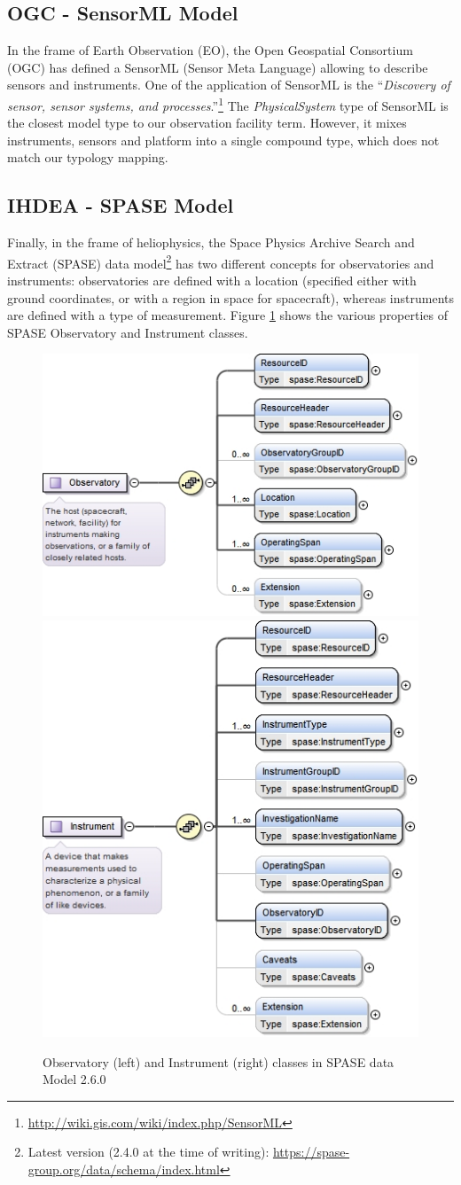 \documentclass[11pt,a4paper]{ivoa}
\begin{document}
\subsection{OGC - SensorML Model}
In the frame of Earth Observation (EO), the Open Geospatial Consortium
(OGC) has defined a SensorML (Sensor Meta Language) \citep{ogc-sensorml}
allowing to describe sensors and instruments. One of the application of
SensorML is the ``\emph{Discovery of sensor, sensor systems, and
processes}.''\footnote{\url{http://wiki.gis.com/wiki/index.php/SensorML}}
The \emph{PhysicalSystem} type of SensorML is the closest model type to
our observation facility term.  However, it mixes instruments, sensors
and platform into a single compound type, which does not match our
typology mapping.

\subsection{IHDEA - SPASE Model}
\label{appendx:models:spase}
Finally, in the frame of heliophysics, the Space Physics Archive Search
and Extract (SPASE) data model\footnote{Latest version (2.4.0 at the
time of writing): \url{https://spase-group.org/data/schema/index.html}}
\citep{Roberts:2018bi,spase-model} has two different
concepts for observatories and instruments: observatories are defined
with a location (specified either with ground coordinates, or with a
region in space for spacecraft), whereas instruments are defined with
a type of measurement. Figure \ref{fig:spase-observatory} shows the
various properties of SPASE Observatory and Instrument classes.

\begin{figure}
{\centering\includegraphics[align=c,width=0.49\linewidth]{spase-2_6_0_xsd_Complex_Type_spase_Observatory.jpg}
\includegraphics[align=c,width=0.49\linewidth]{spase-2_6_0_xsd_Complex_Type_spase_Instrument.jpg}}
\caption{Observatory (left) and Instrument (right) classes in SPASE data Model 2.6.0}\label{fig:spase-observatory}
\end{figure}
\end{document}
